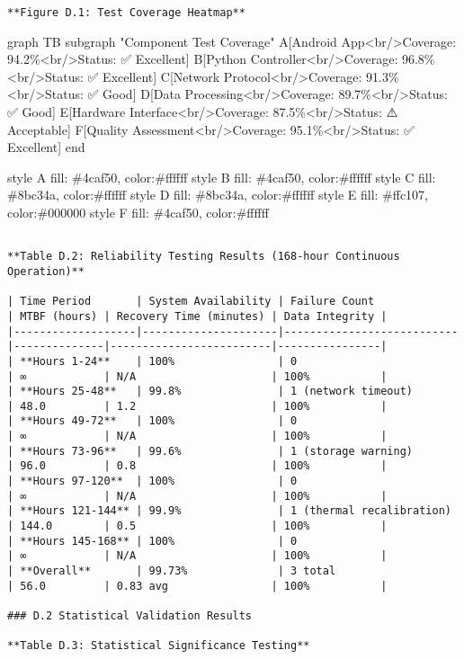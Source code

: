 \documentclass[12pt,a4paper]{report}
\begin{document}
\begin{verbatim}
**Figure D.1: Test Coverage Heatmap**

\end{verbatim}
graph TB
subgraph "Component Test Coverage"
A[Android App<br/>Coverage: 94.2\%<br/>Status: ✅ Excellent]
B[Python Controller<br/>Coverage: 96.8\%<br/>Status: ✅ Excellent]
C[Network Protocol<br/>Coverage: 91.3\%<br/>Status: ✅ Good]
D[Data Processing<br/>Coverage: 89.7\%<br/>Status: ✅ Good]
E[Hardware Interface<br/>Coverage: 87.5\%<br/>Status: ⚠️ Acceptable]
F[Quality Assessment<br/>Coverage: 95.1\%<br/>Status: ✅ Excellent]
end

style A fill: \#4caf50, color:\#ffffff
style B fill: \#4caf50, color:\#ffffff
style C fill: \#8bc34a, color:\#ffffff
style D fill: \#8bc34a, color:\#ffffff
style E fill: \#ffc107, color:\#000000
style F fill: \#4caf50, color:\#ffffff
\begin{verbatim}

**Table D.2: Reliability Testing Results (168-hour Continuous Operation)**

| Time Period       | System Availability | Failure Count             | MTBF (hours) | Recovery Time (minutes) | Data Integrity |
|-------------------|---------------------|---------------------------|--------------|-------------------------|----------------|
| **Hours 1-24**    | 100%                | 0                         | ∞            | N/A                     | 100%           |
| **Hours 25-48**   | 99.8%               | 1 (network timeout)       | 48.0         | 1.2                     | 100%           |
| **Hours 49-72**   | 100%                | 0                         | ∞            | N/A                     | 100%           |
| **Hours 73-96**   | 99.6%               | 1 (storage warning)       | 96.0         | 0.8                     | 100%           |
| **Hours 97-120**  | 100%                | 0                         | ∞            | N/A                     | 100%           |
| **Hours 121-144** | 99.9%               | 1 (thermal recalibration) | 144.0        | 0.5                     | 100%           |
| **Hours 145-168** | 100%                | 0                         | ∞            | N/A                     | 100%           |
| **Overall**       | 99.73%              | 3 total                   | 56.0         | 0.83 avg                | 100%           |

### D.2 Statistical Validation Results

**Table D.3: Statistical Significance Testing**


\end{verbatim}
\end{document}
